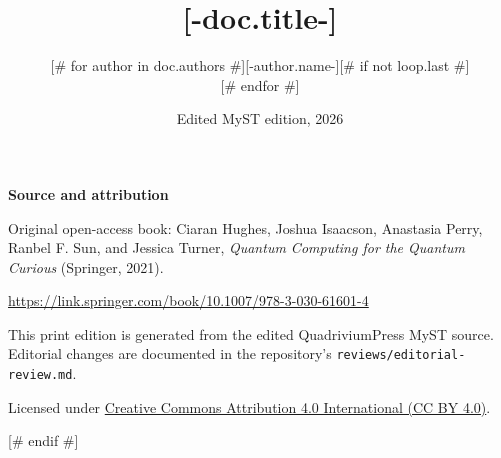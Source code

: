 \documentclass[letterpaper,11pt,oneside,openany]{book}
\title{\Huge\bfseries [-doc.title-]}
\author{[# for author in doc.authors #][-author.name-][# if not loop.last #] \\ [# endif #][# endfor #]}
\date{Edited MyST edition, 2026}
\begin{document}
\sloppy
\frontmatter
\hypersetup{pageanchor=false}
\maketitle
\thispagestyle{empty}
\null\vfill
\noindent\textbf{Source and attribution}\par\medskip
\noindent Original open-access book: Ciaran Hughes, Joshua Isaacson,
Anastasia Perry, Ranbel F. Sun, and Jessica Turner,
\emph{Quantum Computing for the Quantum Curious} (Springer, 2021).\par\smallskip
\noindent\url{https://link.springer.com/book/10.1007/978-3-030-61601-4}\par\medskip
\noindent This print edition is generated from the edited QuadriviumPress MyST
source. Editorial changes are documented in the repository's
\texttt{reviews/editorial-review.md}.\par\medskip
\noindent Licensed under
\href{https://creativecommons.org/licenses/by/4.0/}{Creative Commons Attribution
4.0 International (CC BY 4.0)}.\par\vfill
\clearpage
\hypersetup{pageanchor=true}
\tableofcontents
{}

[# endif #]
\end{document}

